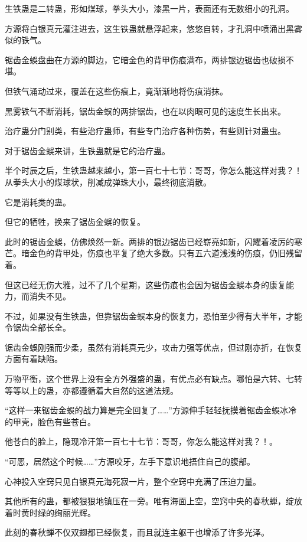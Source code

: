 
\begin{this_body}

生铁蛊是二转蛊，形如煤球，拳头大小，漆黑一片，表面还有无数细小的孔洞。

方源将白银真元灌注进去，这生铁蛊就悬浮起来，悠悠自转，才孔洞中喷涌出黑雾似的铁气。

锯齿金蜈盘曲在方源的脚边，它暗金色的背甲伤痕满布，两排银边锯齿也破损不堪。

但铁气涌动过来，覆盖在这些伤痕上，竟渐渐地将伤痕消抹。

黑雾铁气不断消耗，锯齿金蜈的两排锯齿，也在以肉眼可见的速度生长出来。

治疗蛊分门别类，有些治疗蛊师，有些专门治疗各种伤势，有些则针对蛊虫。

对于锯齿金蜈来讲，生铁蛊就是它的治疗蛊。

半个时辰之后，生铁蛊越来越小，第一百七十七节：哥哥，你怎么能这样对我？！从拳头大小的煤球状，削减成弹珠大小，最终彻底消散。

它是消耗类的蛊。

但它的牺牲，换来了锯齿金蜈的恢复。

此时的锯齿金蜈，仿佛焕然一新。两排的银边锯齿已经崭亮如新，闪耀着凌厉的寒芒。暗金色的背甲处，伤痕也平复了绝大多数。只有五六道浅浅的伤痕，仍旧残留着。

但这已经无伤大雅，过不了几个星期，这些伤痕也会因为锯齿金蜈本身的康复能力，而消失不见。

不过，如果没有生铁蛊，但靠锯齿金蜈本身的恢复力，恐怕至少得有大半年，才能令锯齿全部长全。

锯齿金蜈刚强而少柔，虽然有消耗真元少，攻击力强等优点，但过刚亦折，在恢复方面有着缺陷。

万物平衡，这个世界上没有全方外强盛的蛊，有优点必有缺点。哪怕是六转、七转等等以上的蛊，亦都遵循着大自然的这道法规。

“这样一来锯齿金蜈的战力算是完全回复了……”方源伸手轻轻抚摸着锯齿金蜈冰冷的甲壳，脸色有些苍白。

他苍白的脸上，隐现冷汗第一百七十七节：哥哥，你怎么能这样对我？！。

“可恶，居然这个时候……”方源咬牙，左手下意识地捂住自己的腹部。

心神投入空窍只见白银真元海死寂一片，整个空窍中充满了压迫力量。

其他所有的蛊，都被狠狠地镇压在一旁。唯有海面上空，空窍中央的春秋蝉，绽放着时黄时绿的绚丽光辉。

此刻的春秋蝉不仅双翅都已经恢复，而且就连主躯干也增添了许多光泽。


\end{this_body}

